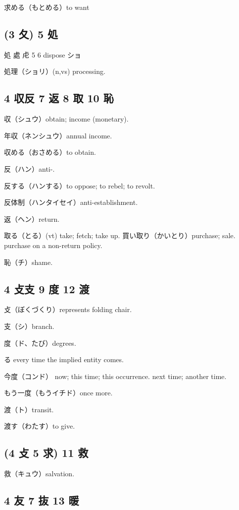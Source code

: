 求める（もとめる）to want

\subsection{(3 夂) 5 処}

処 處 虍 5 6  dispose ショ

処理（ショリ）(n,vs) processing.

\subsection{4 収反 7 返 8 取 10 恥}

収（シュウ）obtain; income (monetary).

年収（ネンシュウ）annual income.

収める（おさめる）to obtain.

反（ハン）anti-.

反する（ハンする）to oppose; to rebel; to revolt.

反体制（ハンタイセイ）anti-establishment.

返（ヘン）return.

取る（とる）(vt) take; fetch; take up.
買い取り（かいとり）purchase; sale. purchase on a non-return policy.

恥（チ）shame.

\subsection{4 攴支 9 度 12 渡}

攴（ぼくづくり）represents folding chair.

支（シ）branch.

度（ド、たび）degrees.

る
every time the implied entity comes.

今度（コンド）
now; this time; this occurrence.
next time; another time.

もう一度（もうイチド）once more.

渡（ト）transit.

渡す（わたす）to give.

\subsection{(4 攴 5 求) 11 救}

救（キュウ）salvation.

\subsection{4 友 7 抜 13 暖}


